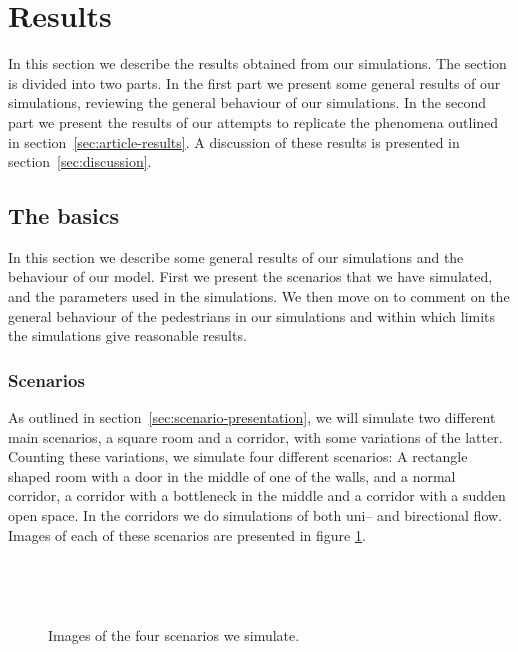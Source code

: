 \section{Results}
\label{sec:results}
In this section we describe the results obtained from our simulations.  The 
section is divided into two parts. In the first part we present some general 
results of our simulations, reviewing the general behaviour of our 
simulations. In the second part we present the results of our attempts to 
replicate the phenomena outlined in section~\ref{sec:article-results}. A 
discussion of these results is presented in section~\ref{sec:discussion}.

\subsection{The basics}
In this section we describe some general results of our simulations and the 
behaviour of our model. First we present the scenarios that we have simulated, 
and the parameters used in the simulations. We then move on to comment on the 
general behaviour of the pedestrians in our simulations and within which 
limits the simulations give reasonable results.

\subsubsection{Scenarios}
As outlined in section~\ref{sec:scenario-presentation}, we will simulate two 
different main scenarios, a square room and a corridor, with some variations 
of the latter. Counting these variations, we simulate four different 
scenarios: A rectangle shaped room with a door in the middle of one of the 
walls, and a normal corridor, a corridor with a bottleneck in the middle and a 
corridor with a sudden open space. In the corridors we do simulations of both 
uni-- and birectional flow. Images of each of these scenarios are presented in 
figure \ref{fig:fourcases}.

\begin{figure}[h]
\centering
\begin{minipage}{0.45\textwidth}
    \centering
    \\
    \subfloat[Corridor.]{\resizebox{\textwidth}{!}{}}
\end{minipage}
\begin{minipage}{0.45\textwidth}
    \centering
    \vspace{1.4cm}
    \subfloat[Bottleneck.]{\resizebox{\textwidth}{!}{}} 
    \\
    \vspace{6mm}
\end{minipage}
\caption{Images of the four scenarios we simulate.}
\label{fig:fourcases}
\end{figure}


